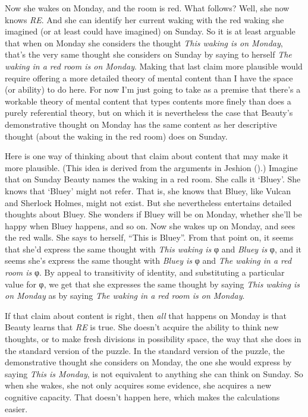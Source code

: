 \documentclass[
  10pt,
  letterpaper,
  DIV=11,
  numbers=noendperiod,
  twoside]{scrartcl}
\begin{document}
Now she wakes on Monday, and the room is red. What follows? Well, she
now knows \emph{RE}. And she can identify her current waking with the
red waking she imagined (or at least could have imagined) on Sunday. So
it is at least arguable that when on Monday she considers the thought
\emph{This waking is on Monday}, that's the very same thought she
considers on Sunday by saying to herself \emph{The waking in a red room
is on Monday}. Making that last claim more plausible would require
offering a more detailed theory of mental content than I have the space
(or ability) to do here. For now I'm just going to take as a premise
that there's a workable theory of mental content that types contents
more finely than does a purely referential theory, but on which it is
nevertheless the case that Beauty's demonstrative thought on Monday has
the same content as her descriptive thought (about the waking in the red
room) does on Sunday.

Here is one way of thinking about that claim about content that may make
it more plausible. (This idea is derived from the arguments in Jeshion
().) Imagine that on Sunday Beauty names
the waking in a red room. She calls it `Bluey'. She knows that `Bluey'
might not refer. That is, she knows that Bluey, like Vulcan and Sherlock
Holmes, might not exist. But she nevertheless entertains detailed
thoughts about Bluey. She wonders if Bluey will be on Monday, whether
she'll be happy when Bluey happens, and so on. Now she wakes up on
Monday, and sees the red walls. She says to herself, ``This is Bluey''.
From that point on, it seems that she'd express the same thought with
\emph{This waking is} φ and \emph{Bluey is} φ, and it seems she's
express the same thought with \emph{Bluey is} φ and \emph{The waking in
a red room is} φ. By appeal to transitivity of identity, and
substituting a particular value for φ, we get that she expresses the
same thought by saying \emph{This waking is on Monday} as by saying
\emph{The waking in a red room is on Monday}.

If that claim about content is right, then \emph{all} that happens on
Monday is that Beauty learns that \emph{RE} is true. She doesn't acquire
the ability to think new thoughts, or to make fresh divisions in
possibility space, the way that she does in the standard version of the
puzzle. In the standard version of the puzzle, the demonstrative thought
she considers on Monday, the one she would express by saying \emph{This
is Monday}, is not equivalent to anything she can think on Sunday. So
when she wakes, she not only acquires some evidence, she acquires a new
cognitive capacity. That doesn't happen here, which makes the
calculations easier.
\end{document}
